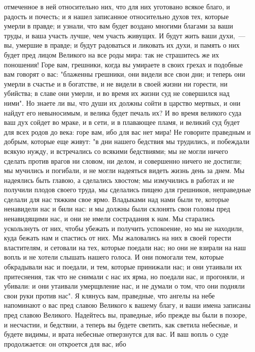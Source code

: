 отмеченное в ней относительно них, что для них уготовано всякое благо, и
радость и почесть; и я нашел записанное относительно духов тех, которые умерли
в правде; и узнали, что вам будет воздано многими благами за ваши труды, и ваша
участь лучше, чем участь живущих.
И будут жить ваши духи,~--- вы, умершие в правде; и будут радоваться и
ликовать их духи, и память о них будет пред лицом Великого на все роды мира:
так не страшитесь же их поношения!
Горе вам, грешники, когда вы умираете в своих грехах и подобные вам
говорят о вас: "блаженны грешники, они видели все свои дни; и теперь они умерли
в счастье и в богатстве, и не видели в своей жизни ни горести, ни убийства; в
славе они умерли, и во время их жизни суд не совершился над ними".
Но знаете ли вы, что души их должны сойти в царство мертвых, и они
найдут его невыносимым, и велика будет печаль их?
И во время великого суда ваш дух сойдет во мраке, и в сети, и в
плавающее пламя, и великий суд будет для всех родов до века: горе вам, ибо для
вас нет мира!
Не говорите праведным и добрым, которые еще живут: "в дни нашего
бедствия мы трудились, и побеждали всякую нужду, и встречались со всякими
бедствиями; мы не могли ничего сделать против врагов ни словом, ни делом, и
совершенно ничего не достигли; мы мучились и погибали, и не могли надеяться
видеть жизнь день за днем.
Мы надеялись быть главою, а сделались хвостом; мы измучились в
работах и не получили плодов своего труда, мы сделались пищею для грешников,
неправедные сделали для нас тяжким свое ярмо.
Владыками над нами были те, которые ненавидели нас и били нас: и мы
должны были склонять свои головы пред ненавидящими нас, и они не имели
сострадания к нам.
Мы старались ускользнуть от них, чтобы убежать и получить успокоение,
но мы не находили, куда бежать нам и спастись от них.
Мы жаловались на них в своей горести властителям, и сетовали на тех,
которые поедали нас; но они не взирали на наш вопль и не хотели слышать нашего
голоса.
И они помогали тем, которые обкрадывали нас и поедали, и тем, которые
принижали нас; и они утаивали их притеснения, так что не снимали с нас их ярма,
но поедали нас, и прогоняли, и убивали: и они утаивали умерщвление нас, и не
думали о том, что они подняли свои руки против нас".
Я клянусь вам, праведные, что ангелы на небе напоминают о вас
пред славою Великого к вашему благу, и ваши имена записаны пред славою
Великого.
Надейтесь вы, праведные, ибо прежде вы были в позоре, и несчастии, и
бедствии, а теперь вы будете светить, как светила небесные, и будете видимы, и
врата небесные отверзнутся для вас.
И ваш вопль о суде продолжается: он откроется для вас, ибо
